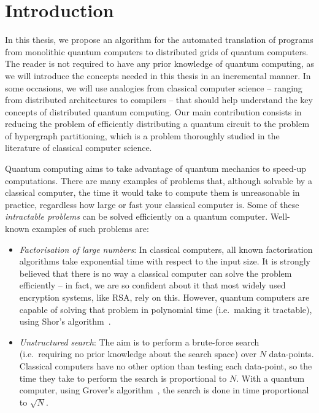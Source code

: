 \chapter{Introduction}
\label{chap:Introduction}

In this thesis, we propose an algorithm for the automated translation of programs from monolithic quantum computers to distributed grids of quantum computers. The reader is not required to have any prior knowledge of quantum computing, as we will introduce the concepts needed in this thesis in an incremental manner. In some occasions, we will use analogies from classical computer science -- ranging from distributed architectures to compilers -- that should help understand the key concepts of distributed quantum computing. Our main contribution consists in reducing the problem of efficiently distributing a quantum circuit to the problem of hypergraph partitioning, which is a problem thoroughly studied in the literature of classical computer science.

Quantum computing aims to take advantage of quantum mechanics to speed-up computations. There are many examples of problems that, although solvable by a classical computer, the time it would take to compute them is unreasonable in practice, regardless how large or fast your classical computer is. Some of these \textit{intractable problems} can be solved efficiently on a quantum computer. Well-known examples of such problems are:

\begin{itemize} 
\item \textit{Factorisation of large numbers}: In classical computers, all known factorisation algorithms take exponential time with respect to the input size. It is strongly believed that there is no way a classical computer can solve the problem efficiently -- in fact, we are so confident about it that most widely used encryption systems, like RSA, rely on this. However, quantum computers are capable of solving that problem in polynomial time (i.e.\ making it tractable), using Shor's algorithm~\citep{Shor}.
\item \textit{Unstructured search}: The aim is to perform a brute-force search (i.e.\ requiring no prior knowledge about the search space) over \(N\) data-points. Classical computers have no other option than testing each data-point, so the time they take to perform the search is proportional to \(N\). With a quantum computer, using Grover's algorithm~\citep{Grover}, the search is done in time proportional to \(\sqrt{N}\).
\end{itemize}

